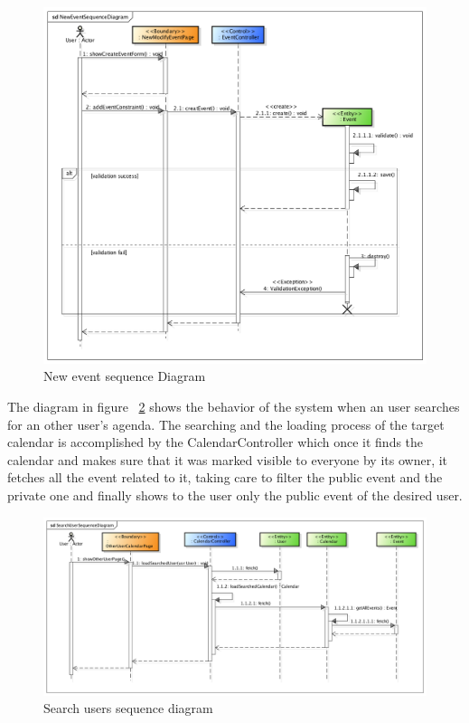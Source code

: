   \begin{center}
 \begin{figure}[H]
    \includegraphics[width=1\textwidth]{../BCEDiagram/BCE/EntityOverview/NewEventSequenceDiagram.png}
    \caption{New event sequence Diagram}
     \label{fig:newEveSeq}
     \end{figure}
   \end{center} 
The diagram in figure ~\ref{fig:searchusSeq} shows the behavior of the system when an user searches for an other user's agenda. The searching and the loading process of the target calendar is accomplished by the CalendarController which once it finds the calendar and makes sure that it was marked visible to everyone by its owner, it fetches all the event related to it, taking care to filter the public event and the private one and finally shows to the user only the public event of the desired user.
 \begin{center}
 \begin{figure}[H]
    \includegraphics[width=1\textwidth]{../BCEDiagram/BCE/EntityOverview/SearchUserSequenceDiagram.png}
    \caption{Search users sequence diagram}
     \label{fig:searchusSeq}
     \end{figure}
   \end{center} 
